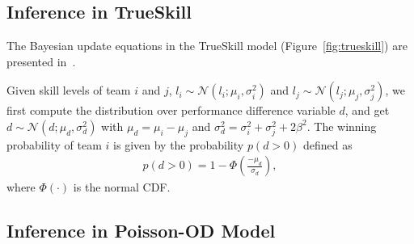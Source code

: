 \documentclass[runningheads,a4paper]{llncs}
\begin{document}
\subsection{Inference in TrueSkill}

The Bayesian update equations in the TrueSkill model
(Figure~\ref{fig:trueskill}) are presented
in~\cite{herbrich06569}.

 Given skill levels of
team $i$ and $j$, $l_i\sim\mathcal{N}(l_i;\mu_i,\sigma_i^2)$ and
$l_j\sim\mathcal{N}(l_j;\mu_j,\sigma_j^2)$, we first compute the
distribution over performance difference variable $d$, and get
$d\sim\mathcal{N}(d;\mu_d,\sigma_d^2)$ with $\mu_d = \mu_i - \mu_j$
and $\sigma_d^2 = \sigma_i^2 + \sigma_j^2+2\beta^2$. The winning
probability of team $i$ is given by the probability $p(d>0)$ defined as
{\small
\begin{align}
  p(d>0) = 1 - \Phi\left(\frac{-\mu_d}{\sigma_d}\right),
\end{align}}
where $\Phi(\cdot)$ is the normal CDF.

%

\subsection{Inference in Poisson-OD Model}
\label{sec:PoissonInference}
\end{document}
